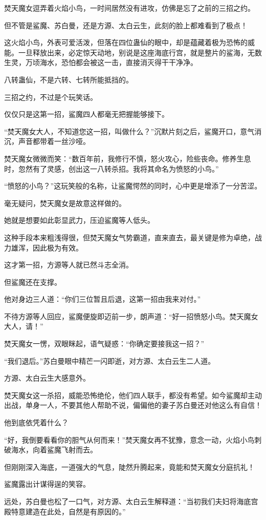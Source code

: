 \begin{this_body}
焚天魔女逗弄着火焰小鸟，一时间居然没有进攻，仿佛是忘了之前的三招之约。

但不管是鲨魔、苏白曼，还是方源、太白云生，此刻的脸上都难看到了极点！

这火焰小鸟，外表可爱活泼，但落在四位蛊仙的眼中，却是蕴藏着极为恐怖的威能。一旦释放出来，必定惊天动地，别说是这座海底行宫，就是整片的鲨海，无数生灵，万顷海水，恐怕都会被这一击，直接消灭得干干净净。

八转蛊仙，不是六转、七转所能抵挡的。

三招之约，不过是个玩笑话。

仅仅只是这第一招，鲨魔四人都毫无把握能够接下。

“焚天魔女大人，不知道您这一招，叫做什么？”沉默片刻之后，鲨魔开口，意气消沉，声音都带着一丝沙哑。

焚天魔女微微而笑：“数百年前，我修行不慎，怒火攻心，险些丧命。修养生息时，忽然有了灵感，创出这一八转杀招。我将其命名为愤怒的小鸟。”

“愤怒的小鸟？”这玩笑般的名称，让鲨魔愕然的同时，心中更是增添了一分苦涩。

毫无疑问，焚天魔女是故意这样做的。

她就是想要如此彰显武力，压迫鲨魔等人低头。

这种手段本来粗浅得很，但焚天魔女气势霸道，直来直去，最关键是修为卓绝，战力雄浑，因此极为有效。

这才第一招，方源等人就已然斗志全消。

但鲨魔还在支撑。

他对身边三人道：“你们三位暂且后退，这第一招由我来对付。”

不待方源等人回应，鲨魔便旋即迈前一步，朗声道：“好一招愤怒小鸟。焚天魔女大人，请！”

焚天魔女一愣，双眼眯起，语气疑惑：“你确定要接我这一招？”

“我们退后。”苏白曼眼中精芒一闪即逝，对方源、太白云生二人道。

方源、太白云生大感意外。

焚天魔女这一杀招，威能恐怖绝伦，他们四人联手，都没有希望。如今鲨魔却主动出战，单身一人，不要其他人帮助不说，偏偏他的妻子苏白曼还对他这么有自信！

他到底依凭着什么？

“好，我倒要看看你的胆气从何而来！”焚天魔女再不犹豫，意念一动，火焰小鸟刺破海水，向着鲨魔飞射而去。

但刚刚深入海底，一道强大的气息，陡然升腾起来，竟能和焚天魔女分庭抗礼！

鲨魔露出计谋得逞的笑容。

远处，苏白曼也松了一口气，对方源、太白云生解释道：“当初我们夫妇将海底宫殿特意建造在此处，自然是有原因的。”

\end{this_body}

